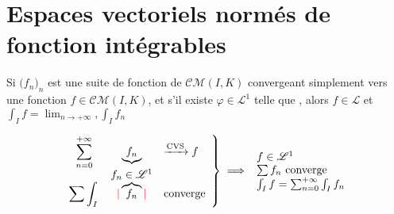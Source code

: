 \documentclass[11pt,a4paper,fleqn,pdftex]{report}
\begin{document}
\section{Espaces vectoriels normés de fonction intégrables}
\begin{itheorem}
    Si $\big( f_n \big)_n$ est une suite de fonction de $\mathcal{CM}(I,K) $ convergeant simplement vers une fonction $f \in \mathcal{CM}(I,K)$, et s'il existe $\varphi \in \mathscr{L}^1 $ telle que ,\newline
    alors $f \in \mathscr{L}$ et $\int_I f = \lim_{n \to +\infty}, \int_I f_n$
\end{itheorem}
\begin{itheorem}
    \begin{equation}
        \displaystyle
        \left.
        \begin{array}{c c l}
        \displaystyle\sum_{n=0}^{+\infty} & \underbrace{f_n} & \xrightarrow{\text{CVS}} f \\
                     & f_n \in \mathscr{L}^1 & \\
        \displaystyle\sum  \int_I \vphantom{\overbrace{f_n}} & \textcolor{couleurImp}{|}\overbrace{f_n}\textcolor{couleurImp}{|} & \text{converge}
        \end{array}
        \right\rbrace 
        \implies 
        \begin{array}{l}
        f \in \mathscr{L}^1 \\
        \sum f_n \text{ converge} \\
        \int_I f = \sum_{n=0}^{+\infty} \int_I f_n
        \end{array}
    \end{equation}
\end{itheorem}
\end{document}
